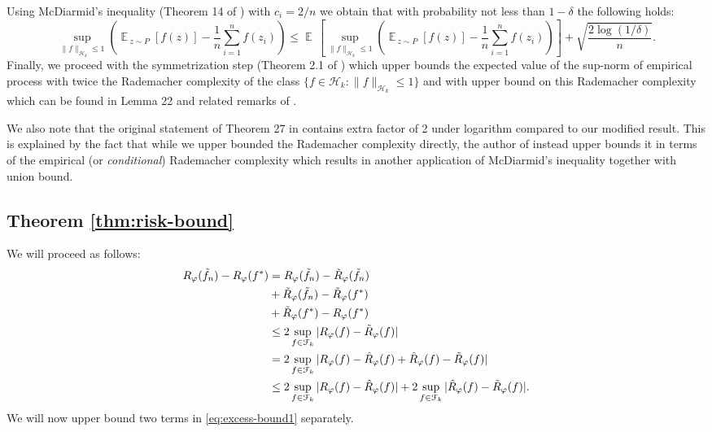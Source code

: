 \documentclass{article}
\DeclareMathOperator*{\E}{\mathbb{E}\,}
\renewcommand{\H}{\mathcal{H}}
\newcommand{\F}{\mathcal{F}}
\newcommand{\Rp}{R_{\varphi}}
\newcommand{\Rpn}{\hat{R}_{\varphi}}
\newcommand{\Rpnt}{\tilde{R}_{\varphi}}
\newcommand{\f}{f^*}
\newcommand{\fnt}{\tilde{f}_n}
\begin{document}
Using McDiarmid's inequality (Theorem 14 of \cite{S06}) with $c_i=2/n$ we
obtain that with probability not less than $1-\delta$ the following holds:
\[
\sup_{\|f\|_{\H_k}\leq 1}\left(
\E_{z\sim P}[f(z)]
-
\frac{1}{n}\sum_{i=1}^n f(z_i)
\right)
\leq
\E\left[\sup_{\|f\|_{\H_k}\leq 1}\left(
\E_{z\sim P}[f(z)]
-
\frac{1}{n}\sum_{i=1}^n f(z_i)
\right)\right]
+
\sqrt{\frac{2\log(1/\delta)}{n}}.
\]
Finally, we proceed with the symmetrization step (Theorem 2.1 of \cite{K11})
which upper bounds the expected value of the sup-norm of empirical process with
twice the Rademacher complexity of the class $\{f\in\H_k\colon \|f\|_{\H_k}\leq
1\}$ and with upper bound on this Rademacher complexity which can be found in
Lemma 22 and related remarks of \cite{BM01}.

We also note that the original statement of Theorem 27 in \cite{S06} contains
extra factor of 2 under logarithm compared to our modified result.  This is
explained by the fact that while we upper bounded the Rademacher complexity
directly, the author of \cite{S06} instead upper bounds it in terms of the
empirical (or \emph{conditional}) Rademacher complexity which results in
another application of McDiarmid's inequality together with union bound.

\subsection{Theorem \ref{thm:risk-bound}}\label{sect:ProofRiskBound}
We will proceed as follows:
\begin{align}
\notag
\Rp(\fnt) - \Rp(\f)
&=
\Rp(\fnt) - \Rpnt(\fnt)\\
\notag
&+
\Rpnt(\fnt) -\Rpnt(\f)\\
\notag
&+
\Rpnt(\f) - \Rp(\f)\\
\notag
&\leq
2\sup_{f\in \F_k}|\Rp(f) - \Rpnt(f)|\\
\notag
&=
2\sup_{f\in \F_k}|\Rp(f) - \Rpn(f) + \Rpn(f) - \Rpnt(f)|\\
&\leq
\label{eq:excess-bound1}
2\sup_{f\in \F_k}|\Rp(f) - \Rpn(f)|
+
2\sup_{f\in \F_k}|\Rpn(f) - \Rpnt(f)|.
\end{align}
We will now upper bound two terms in \eqref{eq:excess-bound1} separately.
\end{document}
